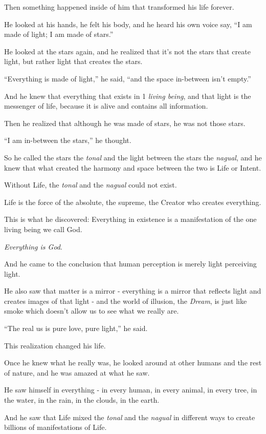 \documentclass{article}
\numberwithin{equation}{section}
\begin{document}
Then something happened inside of him that transformed his life forever.

He looked at his hands, he felt his body, and he heard his own voice say, ``I am made of light; I am made of stars.''

%
He looked at the stars again, and he realized that it's not the stars that create light, but rather light that creates the stars.

``Everything is made of light,'' he said, ``and the space in-between isn't empty.''

And he knew that everything that exists in 1 \textit{living being}, and that light is the messenger of life, because it is alive and contains all information.

%
Then he realized that although he was made of stars, he was not those stars.

``I am in-between the stars,'' he thought.

So he called the stars the \textit{tonal} and the light between the stars the \textit{nagual}, and he knew that what created the harmony and space between the two is Life or Intent.

Without Life, the \textit{tonal} and the \textit{nagual} could not exist.

Life is the force of the absolute, the supreme, the Creator who creates everything.

%
This is what he discovered: Everything in existence is a manifestation of the one living being we call God.

\textit{Everything is God}.

And he came to the conclusion that human perception is merely light perceiving light.

He also saw that matter is a mirror - everything is a mirror that reflects light and creates images of that light - and the world of illusion, the \textit{Dream}, is just like smoke which doesn't allow us to see what we really are.

``The real us is pure love, pure light,'' he said.

%
This realization changed his life.

Once he knew what he really was, he looked around at other humans and the rest of nature, and he was amazed at what he saw.

He saw himself in everything - in every human, in every animal, in every tree, in the water, in the rain, in the clouds, in the earth.

And he saw that Life mixed the \textit{tonal} and the \textit{nagual} in different ways to create billions of manifestations of Life.
\end{document}
